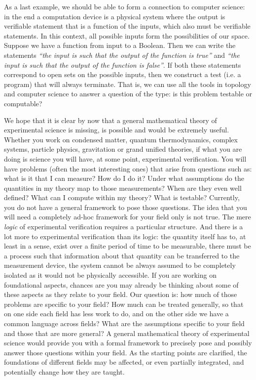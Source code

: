 \documentclass[letterpaper]{article}
\theoremstyle{plain}%
\theoremstyle{definition}
\theoremstyle{remark}
\numberwithin{equation}{section}
\newcommand{\statement}[1] {\emph{``#1''}}
\begin{document}
As a last example, we should be able to form a connection to computer science: in the end a computation device is a physical system where the output is verifiable statement that is a function of the inputs, which also must be verifiable statements. In this context, all possible inputs form the possibilities of our space. Suppose we have a function from input to a Boolean. Then we can write the statements \statement{the input is such that the output of the function is true} and \statement{the input is such that the output of the function is false}. If both these statements correspond to open sets on the possible inputs, then we construct a test (i.e. a program) that will always terminate. That is, we can use all the tools in topology and computer science to answer a question of the type: is this problem testable or computable?

We hope that it is clear by now that a general mathematical theory of experimental science is missing, is possible and would be extremely useful. Whether you work on condensed matter, quantum thermodynamics, complex systems, particle physics, gravitation or grand unified theories, if what you are doing is science you will have, at some point, experimental verification. You will have problems (often the most interesting ones) that arise from questions such as: what is it that I can measure? How do I do it? Under what assumptions do the quantities in my theory map to those measurements? When are they even well defined? What can I compute within my theory? What is testable? Currently, you do not have a general framework to pose those questions. The idea that you will need a completely ad-hoc framework for your field only is not true. The mere \emph{logic} of experimental verification requires a particular structure. And there is a lot more to experimental verification than its logic: the quantity itself has to, at least in a sense, exist over a finite period of time to be measurable, there must be a process such that information about that quantity can be transferred to the measurement device, the system cannot be always assumed to be completely isolated as it would not be physically accessible. If you are working on foundational aspects, chances are you may already be thinking about some of these aspects as they relate to your field. Our question is: how much of those problems are specific to your field? How much can be treated generally, so that on one side each field has less work to do, and on the other side we have a common language across fields? What are the assumptions specific to your field and those that are more general? A general mathematical theory of experimental science would provide you with a formal framework to precisely pose and possibly answer those questions within your field. As the starting points are clarified, the foundations of different fields may be affected, or even partially integrated, and potentially change how they are taught.
\end{document}
